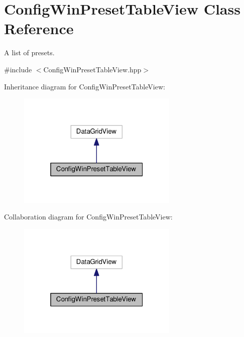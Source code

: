 \hypertarget{classConfigWinPresetTableView}{}\section{Config\+Win\+Preset\+Table\+View Class Reference}
\label{classConfigWinPresetTableView}


A list of presets.  




{\ttfamily \#include $<$Config\+Win\+Preset\+Table\+View.\+hpp$>$}



Inheritance diagram for Config\+Win\+Preset\+Table\+View\+:
\nopagebreak
\begin{figure}[H]
\begin{center}
\leavevmode
\includegraphics[width=217pt]{classConfigWinPresetTableView__inherit__graph}
\end{center}
\end{figure}


Collaboration diagram for Config\+Win\+Preset\+Table\+View\+:
\nopagebreak
\begin{figure}[H]
\begin{center}
\leavevmode
\includegraphics[width=217pt]{classConfigWinPresetTableView__coll__graph}
\end{center}
\end{figure}
